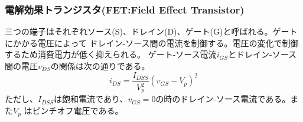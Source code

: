             \subsubsection{電解効果トランジスタ(FET:Field Effect Transistor)}
                三つの端子はそれぞれソース(S)、ドレイン(D)、ゲート(G)と呼ばれる。ゲートにかかる電圧によって
                ドレイン-ソース間の電流を制御する。電圧の変化で制御するため消費電力が低く抑えられる。
                ゲート-ソース電流$i_{GS}$とドレイン-ソース間の電圧$v_{DS}$の関係は次の通りである。
                    \[i_{DS} = \frac{I_{DSS}}{V_p^2}(v_{GS}-V_p)^2\]
                ただし、$I_{DSS}$は飽和電流であり、$v_{GS}=0$の時のドレイン-ソース電流である。また$V_p$
                はピンチオフ電圧である。